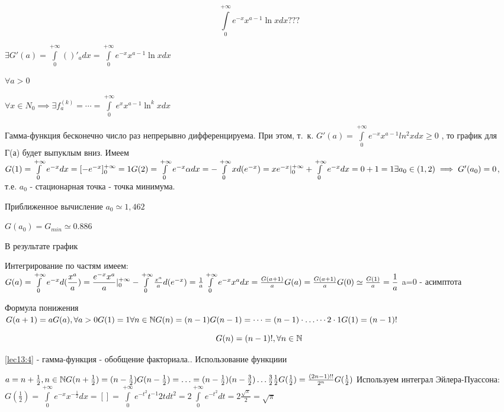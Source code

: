 \documentclass[../../main.tex]{subfiles}
\begin{document}
\[
\int\limits_0^{+\infty} e^{-x} x^{a-1} \ln x dx ???
\]

$
\exists G'(a) = \int\limits_0^{+\infty} ()'_a dx = \int\limits_0^{+\infty} e^{-x} x^{a-1} \ln x dx 
$

$\forall a > 0$

$
\forall x \in N_0 \implies \exists f^{(k)}_a = \cdots = \int\limits_0^{+\infty} e^x x^{a-1} \ln^k x dx 
$

Гамма-функция бесконечно число раз непрерывно дифференцируема.
При этом, т.~к. $G'(a) = \int\limits_0^{+\infty} e^{-x} x^{a-1} ln^2 x dx \ge 0$ , то график для Г(а) будет выпуклым вниз. Имеем
$
G(1) = \int\limits_0^{+\infty} e^{-x} dx = [-e^{-x}]^{+\infty}_0 = 1
\\
G(2) = \int\limits_0^{+\infty} e^{-x} \alpha dx = - \int\limits_0^{+\infty} x d(e^{-x}) = xe^{-x}|^{+\infty}_0 + \int\limits_0^{+\infty} e^{-x} dx = 0 + 1 = 1
\\
\exists a_0 \in (1, 2) \implies G'(a_0) = 0$, т.е. $a_0$ - стационарная точка - точка минимума.

Приближенное вычисление $a_0 \simeq 1,462$

$G(a_0) = G_{min} \simeq 0.886$

В результате график

Интегрирование по частям имеем:
$
G(a) = \int\limits_0^{+\infty} e^{-x} d(\dfrac{x^a}{a}) = \dfrac{e^{-x}x^a}{a} |^{+\infty}_0 - \int\limits_0^{+\infty} \frac{x^a}{a} d(e^{-x}) = \frac{1}{a} \int\limits_0^{+\infty} e^{-x} x^a dx = \frac{G(a+1)}{a}
\\
G(a) = \frac{G(a+1)}{a}
\\
G(0) \simeq \frac{G(1)}{a} = \dfrac{1}{a}
$
a=0 - асимптота

Формула понижения
\\
$
G(a+1) = aG(a), \forall a > 0
\\
G(1) = 1
\\
\forall n \in \mathbb{N}
\\
G(n) = (n-1)G(n-1) = \cdots = (n-1) \cdot \ldots \cdots 2 \cdot 1 G(1) = (n-1)!
$

\begin{equation}
\label{lec13:4}
G(n) = (n-1)!,  \forall n \in \mathbb{N}
\end{equation}

\eqref{lec13:4} - гамма-функция - обобщение факториала.. Использование функциии

$
a = n + \frac{1}{2}, n \in \mathbb{N}
\\
G(n + \frac{1}{2}) = (n - \frac{1}{2})G(n-\frac{1}{2})=\ldots=(n-\frac{1}{2})(n-\frac{3}{2})\ldots\frac{3}{2}\frac{1}{2}G(\frac{1}{2}) = \frac{(2n-1)!!}{2^n}G(\frac{1}{2})
$
Используем интеграл Эйлера-Пуассона:
\\
$
G(\frac{1}{2})= \int\limits_0^{+\infty} e^{-x} x^{-\frac{1}{2}} dx = [] = \int\limits_0^{+\infty} e^{-t^2} t^{-1} 2t dt^2 = 2 \int\limits_0^{+\infty} e^{-t^2} dt = 2 \frac{\sqrt{\pi}}{2} = \sqrt{\pi}
$
\end{document}
